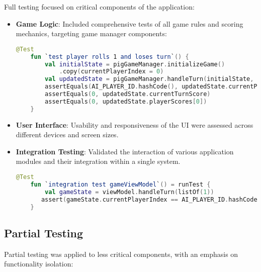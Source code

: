 Full testing focused on critical components of the application:
\begin{itemize}
    \item \textbf{Game Logic}: Included comprehensive tests of all game rules and scoring mechanics, targeting game manager components:
    \begin{lstlisting}[language=Kotlin, caption=Unit Test for Game Logic, label=lst:game_logic_unit]
    @Test
    fun `test player rolls 1 and loses turn`() {
        val initialState = pigGameManager.initializeGame()
            .copy(currentPlayerIndex = 0)
        val updatedState = pigGameManager.handleTurn(initialState, 1) 
        assertEquals(AI_PLAYER_ID.hashCode(), updatedState.currentPlayerIndex)
        assertEquals(0, updatedState.currentTurnScore)
        assertEquals(0, updatedState.playerScores[0])
    } 
    \end{lstlisting}

    \item \textbf{User Interface}: Usability and responsiveness of the UI were assessed across different devices and screen sizes.
    \item \textbf{Integration Testing}: Validated the interaction of various application modules and their integration within a single system.
    \begin{lstlisting}[language=Kotlin, caption=Integration Test for Game View Model, label=lst:integration_game_view_model]
    @Test
    fun `integration test gameViewModel`() = runTest {
        val gameState = viewModel.handleTurn(listOf(1))
       assert(gameState.currentPlayerIndex == AI_PLAYER_ID.hashCode())
    } 
    \end{lstlisting}
\end{itemize}

\subsection{Partial Testing}

Partial testing was applied to less critical components, with an emphasis on functionality isolation:

